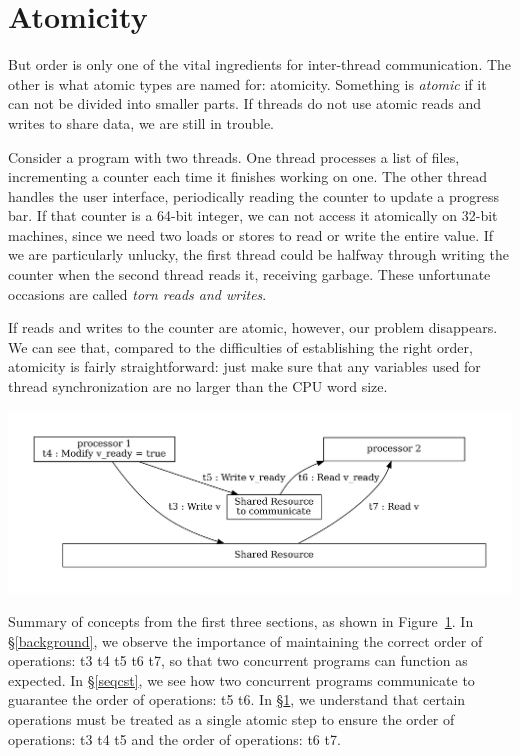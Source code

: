 \documentclass[fontsize=10pt, oneside]{scrartcl}
\newcommand{\fig}[1]{Figure~\ref{#1}}
\newcommand{\introduce}[1]{\textit{#1}}
\newcommand{\secref}[1]{\hyperref[#1]{\textsc{\S}\ref*{#1}}}
\begin{document}
\section{Atomicity}
\label{atomicity}
But order is only one of the vital ingredients for inter-thread communication.
The other is what atomic types are named for: atomicity.
Something is \introduce{atomic} if it can not be divided into smaller parts.
If threads do not use atomic reads and writes to share data, we are still in trouble.

Consider a program with two threads.
One thread processes a list of files, incrementing a counter each time it finishes working on one.
The other thread handles the user interface, periodically reading the counter to update a progress bar.
If that counter is a 64-bit integer, we can not access it atomically on 32-bit machines,
since we need two loads or stores to read or write the entire value.
If we are particularly unlucky, the first thread could be halfway through writing the counter when the second thread reads it,
receiving garbage.
These unfortunate occasions are called \introduce{torn reads and writes}.

If reads and writes to the counter are atomic, however, our problem disappears.
We can see that, compared to the difficulties of establishing the right order,
atomicity is fairly straightforward:
just make sure that any variables used for thread synchronization
are no larger than the \textsc{CPU} word size.

\includegraphics[keepaspectratio, width=0.8\linewidth]{images/atomicity}
\label{atomicity}

Summary of concepts from the first three sections, as shown in \fig{atomicity}.
In \secref{background}, we observe the importance of maintaining the correct order of operations: t3 \to t4 \to t5 \to t6 \to t7, so that two concurrent programs can function as expected.
In \secref{seqcst}, we see how two concurrent programs communicate to guarantee the order of operations: t5 \to t6.
In \secref{atomicity}, we understand that certain operations must be treated as a single atomic step to ensure the order of operations: t3 \to t4 \to t5 and the order of operations: t6 \to t7.
\end{document}
